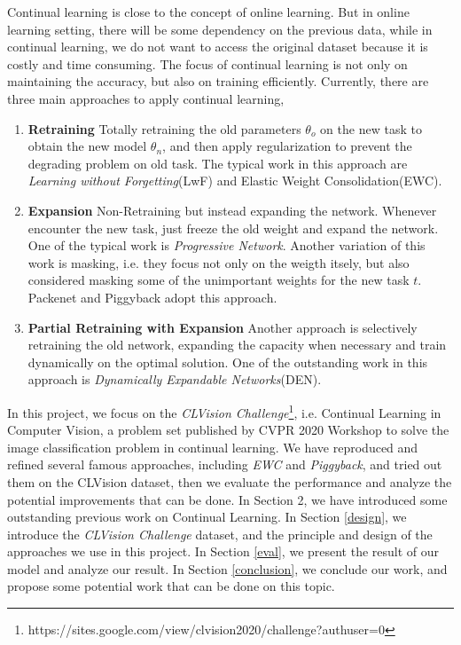 Continual learning is close to the concept of online learning. But in online learning setting, there will be some dependency on the previous data, while in continual learning, we do not want to access the original dataset because it is costly and time consuming. The focus of continual learning is not only on maintaining the accuracy, but also on training efficiently. Currently, there are three main approaches to apply continual learning,
\begin{enumerate}
\item \textbf{Retraining}
Totally retraining the old parameters $\theta_o$ on the new task to obtain the new model $\theta_n$, and then apply regularization to prevent the degrading problem on old task. The typical work in this approach are \textit{Learning without Forgetting}(LwF)\cite{li2017learning} and  Elastic Weight Consolidation(EWC)\cite{kirkpatrick2017overcoming}. 
\item \textbf{Expansion}
Non-Retraining but instead expanding the network. Whenever encounter the new task, just freeze the old weight and expand the network. One of the typical work is \textit{Progressive Network}\cite{rusu2016progressive}. Another variation of this work is masking, i.e. they focus not only on the weigth itsely, but also considered masking some of the unimportant weights for the new task $t$. Packenet\cite{mallya2018packnet} and Piggyback\cite{mallya2018piggyback} adopt this approach.
\item \textbf{Partial Retraining with Expansion}
Another approach is selectively retraining the old network, expanding the capacity when necessary and train dynamically on the optimal solution. One of the outstanding work in this approach is \textit{Dynamically Expandable Networks}(DEN)\cite{yoon2017lifelong}.
\end{enumerate}

In this project, we focus on the \textit{CLVision Challenge}\footnote{https://sites.google.com/view/clvision2020/challenge?authuser=0}, i.e. Continual Learning in Computer Vision, a problem set published by CVPR 2020 Workshop to solve the image classification problem in continual learning. We have reproduced and refined several famous approaches, including \textit{EWC} and \textit{Piggyback}, and tried out them on the CLVision dataset, then we evaluate the performance and analyze the potential improvements that can be done. In Section 2, we have introduced some outstanding previous work on Continual Learning. In Section \ref{design}, we introduce the \textit{CLVision Challenge} dataset, and the principle and design of the approaches we use in this project. In Section \ref{eval}, we present the result of our model and analyze our result. In Section \ref{conclusion}, we conclude our work, and propose some potential work that can be done on this topic.
